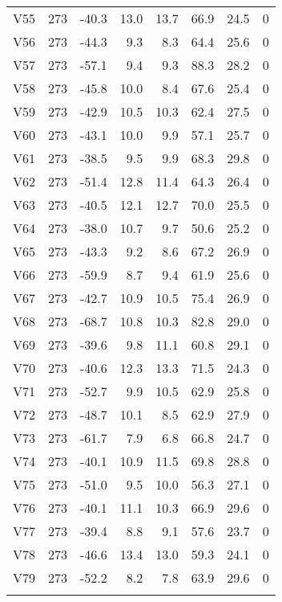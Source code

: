 {\begin{longtable}{lrrrrrrr}
  V55 & 273 & -40.3 & 13.0 & 13.7 & 66.9 & 24.5 & 0 \\ 
  V56 & 273 & -44.3 &  9.3 &  8.3 & 64.4 & 25.6 & 0 \\ 
  V57 & 273 & -57.1 &  9.4 &  9.3 & 88.3 & 28.2 & 0 \\ 
  V58 & 273 & -45.8 & 10.0 &  8.4 & 67.6 & 25.4 & 0 \\ 
  V59 & 273 & -42.9 & 10.5 & 10.3 & 62.4 & 27.5 & 0 \\ 
  V60 & 273 & -43.1 & 10.0 &  9.9 & 57.1 & 25.7 & 0 \\ 
  V61 & 273 & -38.5 &  9.5 &  9.9 & 68.3 & 29.8 & 0 \\ 
  V62 & 273 & -51.4 & 12.8 & 11.4 & 64.3 & 26.4 & 0 \\ 
  V63 & 273 & -40.5 & 12.1 & 12.7 & 70.0 & 25.5 & 0 \\ 
  V64 & 273 & -38.0 & 10.7 &  9.7 & 50.6 & 25.2 & 0 \\ 
  V65 & 273 & -43.3 &  9.2 &  8.6 & 67.2 & 26.9 & 0 \\ 
  V66 & 273 & -59.9 &  8.7 &  9.4 & 61.9 & 25.6 & 0 \\ 
  V67 & 273 & -42.7 & 10.9 & 10.5 & 75.4 & 26.9 & 0 \\ 
  V68 & 273 & -68.7 & 10.8 & 10.3 & 82.8 & 29.0 & 0 \\ 
  V69 & 273 & -39.6 &  9.8 & 11.1 & 60.8 & 29.1 & 0 \\ 
  V70 & 273 & -40.6 & 12.3 & 13.3 & 71.5 & 24.3 & 0 \\ 
  V71 & 273 & -52.7 &  9.9 & 10.5 & 62.9 & 25.8 & 0 \\ 
  V72 & 273 & -48.7 & 10.1 &  8.5 & 62.9 & 27.9 & 0 \\ 
  V73 & 273 & -61.7 &  7.9 &  6.8 & 66.8 & 24.7 & 0 \\ 
  V74 & 273 & -40.1 & 10.9 & 11.5 & 69.8 & 28.8 & 0 \\ 
  V75 & 273 & -51.0 &  9.5 & 10.0 & 56.3 & 27.1 & 0 \\ 
  V76 & 273 & -40.1 & 11.1 & 10.3 & 66.9 & 29.6 & 0 \\ 
  V77 & 273 & -39.4 &  8.8 &  9.1 & 57.6 & 23.7 & 0 \\ 
  V78 & 273 & -46.6 & 13.4 & 13.0 & 59.3 & 24.1 & 0 \\ 
  V79 & 273 & -52.2 &  8.2 &  7.8 & 63.9 & 29.6 & 0 \\ 
  \hline
\label{tab:table4}
\end{longtable}
}
